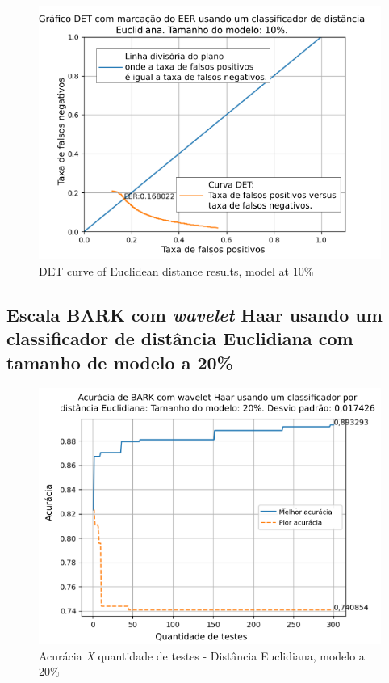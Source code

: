 \begin{figure}[!h]
	\centering
	\includegraphics[width=.9\linewidth]{images/results/det/DET_for_classifier_Euclidian_10}
	\caption{DET curve of Euclidean distance results, model at 10\% }
	\label{fig:detforclassifiereuclidian10}
\end{figure}

\subsection{Escala BARK com \textit{wavelet} Haar usando um classificador de distância Euclidiana com tamanho de modelo a 20\%}


\begin{figure}[ht]
	\centering
	\includegraphics[width=\linewidth]{images/results/confusionMatrices/classifier_Euclidian_20}
	\caption{Acurácia \textit{X} quantidade de testes - Distância Euclidiana, modelo a 20\%}
	\label{fig:classifiereuclidian20}
\end{figure}


